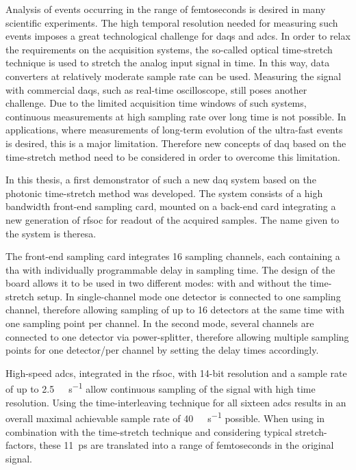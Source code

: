 Analysis of events occurring in the range of femtoseconds is desired in many scientific experiments.
The high temporal resolution needed for measuring such events imposes a great technological challenge for \glspl{daq} and \glspl{adc}.
In order to relax the requirements on the acquisition systems, the so-called optical time-stretch technique is used to stretch the analog input signal in time.
In this way, data converters at relatively moderate sample rate can be used.
Measuring the signal with commercial \glspl{daq}, such as real-time oscilloscope, still poses another challenge.
Due to the limited acquisition time windows of such systems, continuous measurements at high sampling rate over long time is not possible.
In applications, where measurements of long-term evolution of the ultra-fast events is desired, this is a major limitation.
Therefore new concepts of \gls{daq} based on the time-stretch method need to be considered in order to overcome this limitation. 

In this thesis, a first demonstrator of such a new \gls{daq} system based on the photonic time-stretch method was developed.
The system consists of a high bandwidth front-end sampling card, mounted on a back-end card integrating a new generation of \gls{rfsoc} for readout of the acquired samples. The name given to the system is \gls{theresa}.

The front-end sampling card integrates 16 sampling channels, each containing a \gls{tha} with individually programmable delay in sampling time. 
The design of the board allows it to be used in two different modes: with and without the time-stretch setup.
In single-channel mode one detector is connected to one sampling channel, therefore allowing sampling of up to 16 detectors at the same time with one sampling point per channel.
In the second mode, several channels are connected to one detector via power-splitter, therefore allowing multiple sampling points for one detector/per channel by setting the delay times accordingly. 

High-speed \glspl{adc}, integrated in the \gls{rfsoc}, with 14-bit resolution and a sample rate of up to \SI{2.5}{\giga \sample\per\second} allow continuous sampling of the signal with high time resolution. 
Using the time-interleaving technique for all sixteen \glspl{adc} results in an overall maximal achievable sample rate of \SI{40}{\giga\sample\per\second} possible.  
When using in combination with the time-stretch technique and considering typical stretch-factors, these \SI{11}{\pico \second} are translated into a range of femtoseconds in the original signal.

